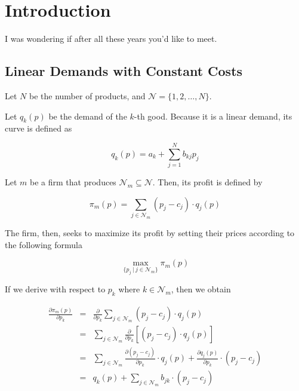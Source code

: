 \documentclass{tfg}
\begin{document}
\cleardoublepage

 \tableofcontents
 \cleardoublepage

\chapter{Introduction}
I was wondering if after all these years you'd like to meet.

\section{Linear Demands with Constant Costs}
Let $N$ be the number of products, and $\mathcal{N} = \{1, 2, \dots, N\}$.

Let $q_k (p)$ be the demand of the $k$-th good. Because it is a linear demand, its curve is defined as

\begin{equation*}
q_k(p) = a_k + \sum_{j=1}^N b_{kj}p_j
\end{equation*}

Let $m$ be a firm that produces $\mathcal{N}_m \subseteq \mathcal{N}$. Then, its profit is defined by

\begin{equation*}
\pi_m(p) = \sum_{j \in \mathcal{N}_m} (p_j - c_j)\cdot q_j(p)
\end{equation*}

The firm, then, seeks to maximize its profit by setting their prices according to the following formula

\begin{equation*}
\max_{\{p_j ~ | ~ j \in \mathcal{N}_m\}} \pi_m(p)
\end{equation*}

If we derive with respect to $p_k$ where $k\in \mathcal{N}_m$, then we obtain

\begin{eqnarray*}
\frac{\partial\pi_m(p)}{\partial p_k} &=& \frac{\partial}{\partial p_k} \sum_{j \in \mathcal{N}_m} (p_j - c_j) \cdot q_j(p) \\
&=& \sum_{j \in \mathcal{N}_m} \frac{\partial}{\partial p_k} \left[(p_j - c_j) \cdot q_j(p)\right] \\
&=& \sum_{j \in \mathcal{N}_m} \frac{\partial (p_j - c_j)}{\partial p_k} \cdot q_j(p) + \frac{\partial q_j(p)}{\partial p_k} \cdot (p_j - c_j)\\
&=& q_k(p) + \sum_{j \in \mathcal{N}_m} b_{jk} \cdot (p_j - c_j) 
\end{eqnarray*}
\end{document}
